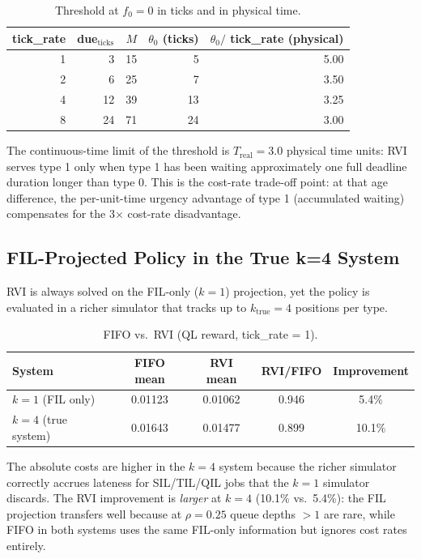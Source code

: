 \documentclass[11pt,a4paper]{article}
\begin{document}
\begin{table}[h]
\centering
\caption{Threshold at $f_0 = 0$ in ticks and in physical time.}
\label{tab:threshold}
\begin{tabular}{rrrrr}
\toprule
tick\_rate & due$_\text{ticks}$ & $M$ & $\theta_0$ (ticks) & $\theta_0 /$ tick\_rate (physical) \\
\midrule
1 &  3 & 15 &  5 & 5.00 \\
2 &  6 & 25 &  7 & 3.50 \\
4 & 12 & 39 & 13 & 3.25 \\
8 & 24 & 71 & 24 & 3.00 \\
\bottomrule
\end{tabular}
\end{table}

The continuous-time limit of the threshold is $T_\text{real} = 3.0$ physical
time units: RVI serves type 1 only when type 1 has been waiting approximately
one full deadline duration longer than type 0.  This is the cost-rate trade-off
point: at that age difference, the per-unit-time urgency advantage of type 1
(accumulated waiting) compensates for the 3$\times$ cost-rate disadvantage.

\subsection{FIL-Projected Policy in the True k=4 System}
\label{sec:sectionA}

RVI is always solved on the FIL-only ($k=1$) projection, yet the policy is
evaluated in a richer simulator that tracks up to $k_\text{true} = 4$
positions per type.

\begin{table}[h]
\centering
\caption{FIFO vs.\ RVI (QL reward, tick\_rate = 1).}
\label{tab:sectionA}
\begin{tabular}{lcccc}
\toprule
System & FIFO mean & RVI mean & RVI/FIFO & Improvement \\
\midrule
$k = 1$ (FIL only) & 0.01123 & 0.01062 & 0.946 & 5.4\% \\
$k = 4$ (true system) & 0.01643 & 0.01477 & 0.899 & 10.1\% \\
\bottomrule
\end{tabular}
\end{table}

The absolute costs are higher in the $k=4$ system because the richer simulator
correctly accrues lateness for SIL/TIL/QIL jobs that the $k=1$ simulator
discards.  The RVI improvement is \emph{larger} at $k=4$ (10.1\% vs.\ 5.4\%):
the FIL projection transfers well because at $\rho = 0.25$ queue depths $>1$
are rare, while FIFO in both systems uses the same FIL-only information but
ignores cost rates entirely.
\end{document}
